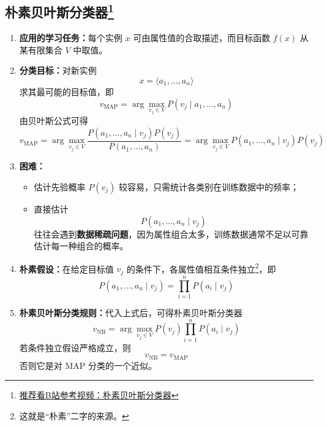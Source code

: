 \documentclass[../main.tex]{subfiles}
\begin{document}
\subsection{朴素贝叶斯分类器\texorpdfstring{\protect\footnote{\href{https://www.bilibili.com/video/BV1eT411V7jM?spm_id_from=333.788.videopod.sections&vd_source=5deca47094767260f853b759a625a68f}{推荐看B站参考视频：朴素贝叶斯分类器}}}{}}\label{sec:naive-bayes}
\begin{enumerate}
    \item \textbf{应用的学习任务：}每个实例 $x$ 可由属性值的合取描述，而目标函数 $f(x)$ 从某有限集合 $V$ 中取值。

    \item \textbf{分类目标：}对新实例
    $$
    x=\langle a_1,\ldots,a_n\rangle
    $$
    求其最可能的目标值，即
    $$
    v_{\mathrm{MAP}}=\arg\max_{v_j\in V}P(v_j\mid a_1,\ldots,a_n)
    $$
    由贝叶斯公式可得
    $$
    v_{\mathrm{MAP}}
    =\arg\max_{v_j\in V}\frac{P(a_1,\ldots,a_n\mid v_j)P(v_j)}{P(a_1,\ldots,a_n)}
    =\arg\max_{v_j\in V}P(a_1,\ldots,a_n\mid v_j)P(v_j)
    $$

    \item \textbf{困难：}
    \begin{itemize}
        \item 估计先验概率 $P(v_j)$ 较容易，只需统计各类别在训练数据中的频率；
        \item 直接估计
        $$
        P(a_1,\ldots,a_n\mid v_j)
        $$
        往往会遇到\textbf{数据稀疏问题}，因为属性组合太多，训练数据通常不足以可靠估计每一种组合的概率。
    \end{itemize}

    \item \textbf{朴素假设：}在给定目标值 $v_j$ 的条件下，各属性值相互条件独立\footnote{    这就是“朴素”二字的来源。}，即
    $$
    P(a_1,\ldots,a_n\mid v_j)=\prod_{i=1}^{n}P(a_i\mid v_j)
    $$


    \item \textbf{朴素贝叶斯分类规则：}代入上式后，可得朴素贝叶斯分类器
    $$
    v_{\mathrm{NB}}=\arg\max_{v_j\in V}P(v_j)\prod_{i=1}^{n}P(a_i\mid v_j)
    $$
    若条件独立假设严格成立，则
    $$
    v_{\mathrm{NB}}=v_{\mathrm{MAP}}
    $$
    否则它是对 MAP 分类的一个近似。


\end{enumerate}
\end{document}
